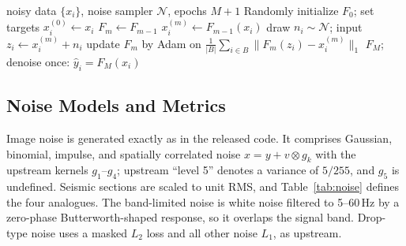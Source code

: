 \documentclass[journal]{IEEEtran}
\begin{document}
\begin{algorithm}[!t]
\caption{Fast IDR (after~\cite{zhang2022idr}), as implemented}
\label{alg:fastidr}
\begin{algorithmic}[1]
\Require noisy data $\{x_i\}$, noise sampler $\mathcal{N}$, epochs $M{+}1$
\State Randomly initialize $F_0$; set targets $x_i^{(0)}\gets x_i$
    \State $F_m \gets F_{m-1}$ 
    \State $x_i^{(m)} \gets F_{m-1}(x_i)$ 
  \EndIf
    \State draw $n_i\sim\mathcal{N}$; input $z_i\gets x_i^{(m)}+n_i$
    \State update $F_m$ by Adam on $\frac{1}{|B|}\sum_{i\in B}\|F_m(z_i)-x_i^{(m)}\|_1$
  \EndFor
\EndFor
\State \Return $F_M$; denoise once: $\hat y_i = F_M(x_i)$
\end{algorithmic}
\end{algorithm}

\subsection{Noise Models and Metrics}
Image noise is generated exactly as in the released code. It comprises Gaussian, binomial, impulse, and spatially correlated noise $x=y+v\otimes g_k$ with the upstream kernels $g_1$--$g_4$; upstream ``level 5'' denotes a variance of $5/255$, and $g_5$ is undefined. Seismic sections are scaled to unit RMS, and Table~\ref{tab:noise} defines the four analogues. The band-limited noise is white noise filtered to 5--60\,Hz by a zero-phase Butterworth-shaped response, so it overlaps the signal band. Drop-type noise uses a masked $L_2$ loss and all other noise $L_1$, as upstream.

\begin{table}[!t]
\centering
\caption{Seismic noise analogues (units of section RMS).}
\label{tab:noise}
\end{table}
\end{document}
